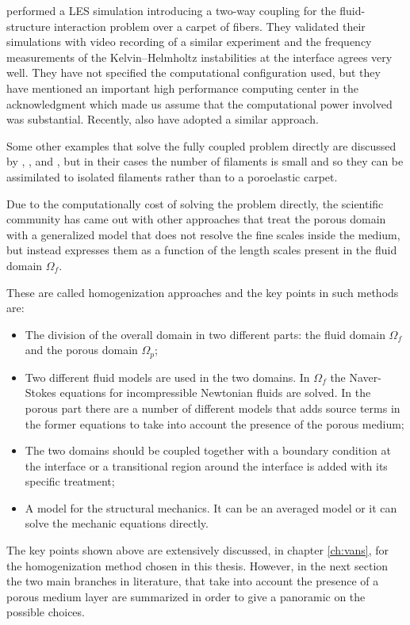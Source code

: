 \citet{dupont2010modelling} performed a LES simulation introducing a two-way coupling for the fluid-structure interaction problem over a carpet of fibers. They validated their simulations with video recording of a similar experiment and the frequency measurements of the Kelvin–Helmholtz instabilities at the interface agrees very well.
They have not specified the computational configuration used, but they have mentioned an important high performance computing center in the acknowledgment which made us assume that the computational power involved was substantial.
Recently, also \citet{marjoribanks2017does} have adopted a similar approach.

Some other examples that solve the fully coupled problem directly are discussed by \citet{monti2017large}, \citet{pinelli2017pelskin}, \citet{favier2017pelskin} and \citet{revell2017pelskin}, but in their cases the number of filaments is small and so they can be assimilated to isolated filaments rather than to a poroelastic carpet.

Due to the computationally cost of solving the problem directly, the scientific community has came out with other approaches that treat the porous domain with a generalized model that does not resolve the fine scales inside the medium, but instead expresses them as a function of the length scales present in the fluid domain $\Omega_{f}$.

These are called homogenization approaches and the key points in such methods are:
\begin{itemize}
	\item The division of the overall domain in two different parts: the fluid domain $\Omega_{f}$ and the porous domain $\Omega_{p}$;
	\item Two different fluid models are used in the two domains. In $\Omega_{f}$ the Naver-Stokes equations for incompressible Newtonian fluids are solved. In the porous part there are a number of different models that adds source terms in the former equations to take into account the presence of the porous medium;
	\item The two domains should be coupled together with a boundary condition at the interface or a transitional region around the interface is added with its specific treatment;
	\item A model for the structural mechanics. It can be an averaged model or it can solve the mechanic equations directly.
\end{itemize}

The key points shown above are extensively discussed, in chapter \ref{ch:vans}, for the homogenization method chosen in this thesis.
However, in the next section the two main branches in literature, that take into account the presence of a porous medium layer are summarized in order to give a panoramic on the possible choices.


